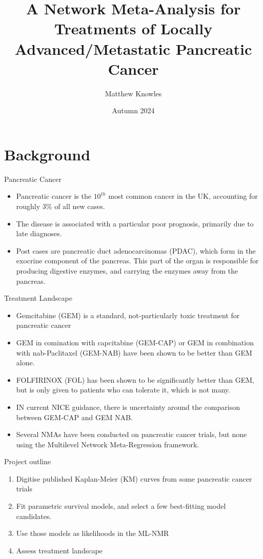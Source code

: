\documentclass{beamer}
\title{A Network Meta-Analysis for Treatments of Locally Advanced/Metastatic Pancreatic Cancer}
\author{Matthew Knowles}
\institute{University of Sheffield}
\date{Autumn 2024}
\begin{document}
\begin{frame}
    \titlepage
\end{frame} 

\section{Background}

\begin{frame}{Pancreatic Cancer}
    \begin{itemize}
        \item Pancreatic cancer is the $10^{th}$ most common cancer in the UK, accounting for roughly $3\%$ of all new cases. 
        \item The disease is associated with a particular poor prognosis, primarily due to late diagnoses.
        \item Post cases are pancreatic duct  adenocarcinomas (PDAC), which form in the exocrine component of the pancreas. This part of the organ is responsible for producing digestive enzymes, and carrying the enzymes away from the pancreas. 
    \end{itemize}
\end{frame}

\begin{frame}{Treatment Landscape}
    \begin{itemize}
        \item Gemcitabine (GEM) is a standard, not-particularly toxic treatment for pancreatic cancer
        \item GEM in comination with capcitabine (GEM-CAP) or GEM in combination with nab-Paclitaxel (GEM-NAB) have been shown to be better than GEM alone.
        \item FOLFIRINOX (FOL) has been shown to be significantly better than GEM, but is only given to patients who can tolerate it, which is not many. 
        \item IN current NICE guidance, there is uncertainty around the comparison between GEM-CAP and GEM NAB.
        \item Several NMAs have been conducted on pancreatic cancer trials, but none using the Multilevel Network Meta-Regression framework.
    \end{itemize} 
\end{frame}

\begin{frame}{Project outline}
    \begin{enumerate}
        \item Digitise published Kaplan-Meier (KM) curves from some pancreatic cancer trials
        \pause
        \item Fit parametric survival models, and select a few best-fitting model candidates.
        \pause
        \item Use those models as likelihoods in the ML-NMR
        \pause
        \item Assess treatment landscape
    \end{enumerate} 
\end{frame} 
\end{document}
